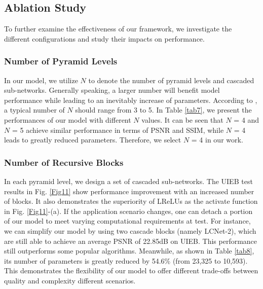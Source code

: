 \documentclass[journal]{IEEEtran}
\begin{document}
\subsection{Ablation Study}
To further examine the effectiveness of our framework, we investigate the different configurations and study their impacts on performance.


\subsubsection{Number of Pyramid Levels}

In our model, we utilize \(N\) to denote the number of pyramid levels and cascaded sub-networks. Generally speaking, a larger number will benefit model performance while leading to an inevitably increase of parameters. According to \cite{lai2018fast}, a typical number of \(N\) should range from 3 to 5. In Table \ref{tab7}, we present the performances of our model with different \(N\) values. It can be seen that \(N\) = 4 and \(N\) = 5 achieve similar performance in terms of PSNR and SSIM, while \(N\) = 4 leads to greatly reduced parameters. Therefore, we select \(N\) = 4 in our work.


\subsubsection{Number of Recursive Blocks}

In each pyramid level, we design a set of cascaded sub-networks. The UIEB test results in Fig. \ref{Fig11} show performance improvement with an increased number of blocks. It also demonstrates the superiority of LReLUs as the activate function in Fig. \ref{Fig11}-(a). If the application scenario changes, one can detach a portion of our model to meet varying computational requirements at test. For instance, we can simplify our model by using two cascade blocks (namely LCNet-2), which are still able to achieve an average PSNR of 22.85dB on UIEB. This performance still outperforms some popular algorithms. Meanwhile, as shown in Table \ref{tab8}, its number of parameters is greatly reduced by 54.6\(\%\) (from 23,325 to 10,593). This demonstrates the flexibility of our model to offer different trade-offs between quality and complexity different scenarios.


\begin{table}[ht]
\centering
\caption{PSNR and SSIM comparisons on UIEB for different numbers of pyramid levels.}
\label{tab7}
\end{table}
\end{document}
